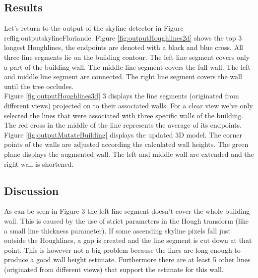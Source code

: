 \subsection{Results}
\noindent
{}
Let's return to the output of the skyline detector in Figure ref{fig:outputskylineFloriande}.
Figure \ref{fig:outputHoughlines2d} shows the top 3 longest Houghlines, the
endpoints are denoted with a black and blue cross. All three line segments lie on the
building contour.  The left line segment covers only a part of the building wall. The
middle line segment covers the full wall. The left and middle line segment are connected. The
right line segment covers the wall until the tree occludes.\\
Figure \ref{fig:outputHoughlines3d} 
3 displays the line segments (originated from
different views) projected on to their associated walls.  For a clear view we've
only selected the lines that were associated with three specific walls of the building.  
The red cross in the middle of the line represents the average of its endpoints.\\
Figure \ref{fig:outputMutateBuilding} 
displays the updated 3D model. The
corner points of the walls are adjusted according the calculated wall heights.
The green plane displays the augmented wall. The left and middle wall are extended
and the right wall is shortened.\\


\subsection{Discussion}
As can be seen in Figure
3 the left line segment doesn't cover the whole
building wall. This is caused by the use of strict parameters in the Hough transform
(like a small line thickness parameter).  If some ascending skyline pixels fall just outside
the Houghlines, a gap is created and the line segment is cut down at that point.
This is however not a big problem because the lines are long enough to produce a
good wall height estimate. Furthermore there are at least 5 other lines
(originated from different views) that support the estimate for this wall.\\



